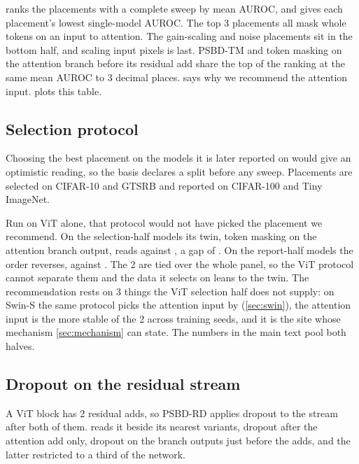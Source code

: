 
\FloatBarrier

 ranks the placements with a complete sweep by mean AUROC, and gives each placement's lowest single-model AUROC. The top 3 placements all mask whole tokens on an input to attention. The gain-scaling and noise placements sit in the bottom half, and scaling input pixels is last. PSBD-TM and token masking on the attention branch before its residual add share the top of the ranking at the same mean AUROC to 3 decimal places.  says why we recommend the attention input.  plots this table.


\FloatBarrier


\subsection{Selection protocol}
\label{app:protocol}

Choosing the best placement on the models it is later reported on would give an optimistic reading, so the basis declares a split before any sweep. Placements are selected on CIFAR-10 and GTSRB and reported on CIFAR-100 and Tiny ImageNet.

Run on ViT alone, that protocol would not have picked the placement we recommend. On the \GainsSelectionHalfN{} selection-half models its twin, token masking on the attention branch output, reads \GainsSelectionHalfTwin{} against \GainsSelectionHalfOurs{}, a gap of \GainsSelectionHalfTwinGap{}. On the \GainsReportHalfN{} report-half models the order reverses, \GainsReportHalfOurs{} against \GainsReportHalfTwin{}. The 2 are tied over the whole panel, so the ViT protocol cannot separate them and the data it selects on leans to the twin. The recommendation rests on 3 things the ViT selection half does not supply: on Swin-S the same protocol picks the attention input by \SwinSelectionHalfTwinGap{} (\cref{sec:swin}), the attention input is the more stable of the 2 across training seeds, and it is the site whose mechanism \cref{sec:mechanism} can state. The numbers in the main text pool both halves.


\subsection{Dropout on the residual stream}
\label{sec:results:residual}\label{app:walk}

A ViT block has 2 residual adds, so PSBD-RD applies dropout to the stream after both of them.  reads it beside its nearest variants, dropout after the attention add only, dropout on the branch outputs just before the adds, and the latter restricted to a third of the network.

